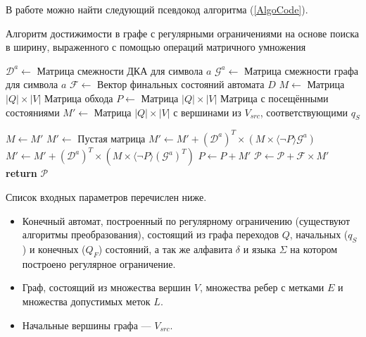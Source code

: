 В работе можно найти следующий псевдокод алгоритма (\ref{AlgoCode}).

\begin{algorithm}[H]
    \caption{Алгоритм достижимости в графе с регулярными ограничениями на основе поиска в ширину, выраженного с помощью операций матричного умножения}
    \label{AlgoCode}
    \begin{algorithmic}[1]
            \State $\mathcal{D}^a\gets $ Матрица смежности ДКА для символа $a$
            \State $\mathcal{G}^a\gets $ Матрица смежности графа для символа $a$
            \State $\mathcal{F}\gets $ Вектор финальных состояний автомата $D$
            \State $M\gets$ Матрица $|Q| \times |V|$ \Comment Матрица обхода
            \State $P\gets$ Матрица $|Q| \times |V|$ \Comment Матрица с посещёнными состояниями
            \State $M'\gets$ Матрица $|Q| \times |V|$ с вершинами из $V_{src}$, соответствующими $q_S$

                \State $M\gets M'$
                \State $M'\gets$ Пустая матрица
                        \State $M'\gets M' + (\mathcal{D}^a)^T \times (M \times \langle \neg P \rangle \mathcal{G}^a)$ 
                    \Else
                        \State $M'\gets M' + (\mathcal{D}^a)^T \times (M \times \langle \neg P \rangle (\mathcal{G}^a)^T)$
                    \EndIf
                \EndFor
                \State $P\gets P + M'$ 
                \State $\mathcal{P}\gets \mathcal{P} + \mathcal{F} \times M'$ 
            \EndWhile
            \State \textbf{return} $\mathcal{P}$
        \EndProcedure
    \end{algorithmic}
    \label{final-algo}
\end{algorithm}

Список входных параметров перечислен ниже.
\begin{itemize}
    \item Конечный автомат, построенный по регулярному ограничению (существуют алгоритмы преобразования), состоящий из графа переходов $Q$, начальных ($q_S$) и конечных ($Q_F$) состояний, а так же алфавита $\delta$ и языка $\Sigma$ на котором построено регулярное ограничение. 
    \item Граф, состоящий из множества вершин $V$, множества ребер с метками $E$ и множества допустимых меток $L$.
    \item Начальные вершины графа --- $V_{src}$.
\end{itemize}

